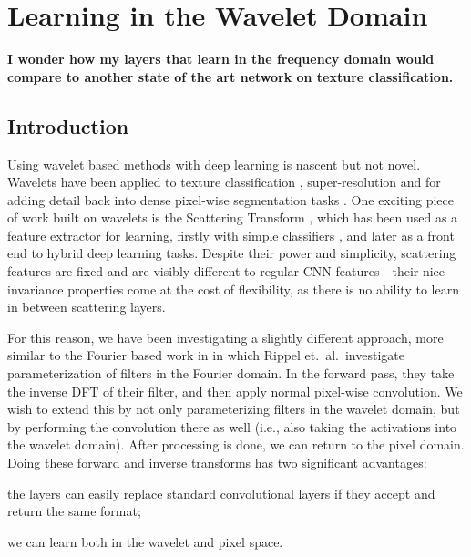 \chapter{Learning in the Wavelet Domain}

\textbf{%
I wonder how my layers that learn in the frequency domain would compare to another state of the art
network on texture classification.
}

\section{Introduction}\label{sec:intro}
Using wavelet based methods with deep learning is nascent but not novel. Wavelets have been applied 
to texture classification \cite{fujieda_wavelet_2017, sifre_combined_2012}, super-resolution
\cite{guo_deep_2017} and for adding detail back into dense pixel-wise segmentation tasks
\cite{ma_detailed_2018}. One exciting piece of work built on wavelets is the Scattering Transform
\cite{mallat_group_2012}, which has been used as a feature extractor for learning, firstly with
simple classifiers \cite{bruna_invariant_2013, singh_scatternet_2017}, and later as a front end to
hybrid deep learning tasks\cite{oyallon_scaling_2017, singh_scatternet_2018}. Despite their power
and simplicity, scattering features are fixed and are visibly different to regular CNN features
\cite{cotter_visualizing_2017} - their nice invariance properties come at the cost of flexibility,
as there is no ability to learn in between scattering layers. 

For this reason, we have been investigating a slightly different approach, more similar to the Fourier based work in
\cite{rippel_spectral_2015} in which Rippel et.\ al.\ investigate parameterization of filters in the Fourier
domain. In the forward pass, they take the inverse DFT of their filter,
and then apply normal pixel-wise convolution. We wish to extend this by not only parameterizing
filters in the wavelet domain, but by performing the convolution there as well
(i.e., also taking the activations into the wavelet domain). After 
processing is done, we can return to the pixel domain. Doing these forward
and inverse transforms has two significant advantages: 
\begin{enumerate*}[label=\roman*)]
  \item the layers can easily replace standard convolutional layers if they accept and return the
    same format;
  \item we can learn both in the wavelet and pixel space.
\end{enumerate*}

